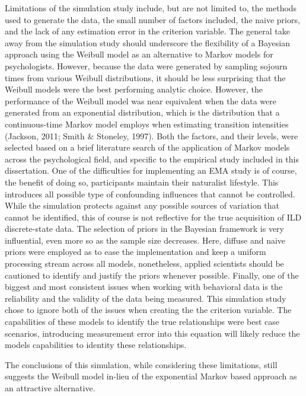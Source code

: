 \documentclass[12pt]{./styles/outhesis}
\begin{document}
Limitations of the simulation study include, but are not limited to, the
methods used to generate the data, the small number of factors included,
the naive priors, and the lack of any estimation error in the criterion
variable. The general take away from the simulation study should
underscore the flexibility of a Bayesian approach using the Weibull
model as an alternative to Markov models for psychologists. However,
because the data were generated by sampling sojourn times from various
Weibull distributions, it should be less surprising that the Weibull
models were the best performing analytic choice. However, the
performance of the Weibull model was near equivalent when the data were
generated from an exponential distribution, which is the distribution
that a continuous-time Markov model employs when estimating transition
intensities (Jackson, 2011; Smith \& Stoneley, 1997). Both the factors,
and their levels, were selected based on a brief literature search of
the application of Markov models across the psychological field, and
specific to the empirical study included in this dissertation. One of
the difficulties for implementing an EMA study is of course, the benefit
of doing so, participants maintain their naturalist lifestyle. This
introduces all possible type of confounding influences that cannot be
controlled. While the simulation protects against any possible sources
of variation that cannot be identified, this of course is not reflective
for the true acquisition of ILD discrete-state data. The selection of
priors in the Bayesian framework is very influential, even more so as
the sample size decreases. Here, diffuse and naive priors were employed
as to ease the implementation and keep a uniform processing stream
across all models, nonetheless, applied scientists should be cautioned to
identify and justify the priors whenever possible. Finally, one of the
biggest and most consistent issues when working with behavioral data is
the reliability and the validity of the data being measured. This
simulation study chose to ignore both of the issues when creating the
the criterion variable. The capabilities of these models to identify the
true relationships were best case scenarios, introducing measurement
error into this equation will likely reduce the models capabilities to
identity these relationships.

The conclusions of this simulation, while considering these limitations,
still suggests the Weibull model in-lieu of the exponential Markov based
approach as an attractive alternative.
\end{document}
